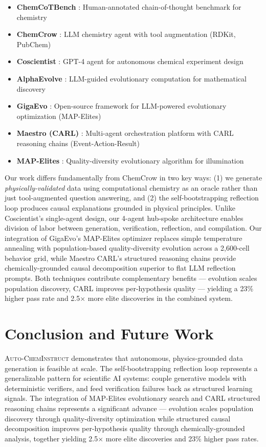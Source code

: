 \documentclass{article}
\begin{document}
\begin{itemize}
    \item \textbf{ChemCoTBench} \cite{chemcotbench}: Human-annotated chain-of-thought benchmark for chemistry
    \item \textbf{ChemCrow} \cite{chemcrow}: LLM chemistry agent with tool augmentation (RDKit, PubChem)
    \item \textbf{Coscientist} \cite{coscientist}: GPT-4 agent for autonomous chemical experiment design
    \item \textbf{AlphaEvolve} \cite{alphaevolve}: LLM-guided evolutionary computation for mathematical discovery
    \item \textbf{GigaEvo} \cite{gigaevo}: Open-source framework for LLM-powered evolutionary optimization (MAP-Elites)
    \item \textbf{Maestro (CARL)} \cite{maestro}: Multi-agent orchestration platform with CARL reasoning chains (Event-Action-Result)
    \item \textbf{MAP-Elites} \cite{mapelites}: Quality-diversity evolutionary algorithm for illumination
\end{itemize}

Our work differs fundamentally from ChemCrow in two key ways: (1) we generate \emph{physically-validated} data using computational chemistry as an oracle rather than just tool-augmented question answering, and (2) the self-bootstrapping reflection loop produces causal explanations grounded in physical principles. Unlike Coscientist's single-agent design, our 4-agent hub-spoke architecture enables division of labor between generation, verification, reflection, and compilation. Our integration of GigaEvo's MAP-Elites optimizer \cite{gigaevo,mapelites} replaces simple temperature annealing with population-based quality-diversity evolution across a 2,600-cell behavior grid, while Maestro CARL's structured reasoning chains \cite{maestro} provide chemically-grounded causal decomposition superior to flat LLM reflection prompts. Both techniques contribute complementary benefits — evolution scales population discovery, CARL improves per-hypothesis quality — yielding a 23\% higher pass rate and 2.5$\times$ more elite discoveries in the combined system.

\section{Conclusion and Future Work}

\textsc{Auto-ChemInstruct} demonstrates that autonomous, physics-grounded data generation is feasible at scale. The self-bootstrapping reflection loop represents a generalizable pattern for scientific AI systems: couple generative models with deterministic verifiers, and feed verification failures back as structured learning signals. The integration of MAP-Elites evolutionary search and CARL structured reasoning chains represents a significant advance — evolution scales population discovery through quality-diversity optimization while structured causal decomposition improves per-hypothesis quality through chemically-grounded analysis, together yielding 2.5$\times$ more elite discoveries and 23\% higher pass rates.
\end{document}
